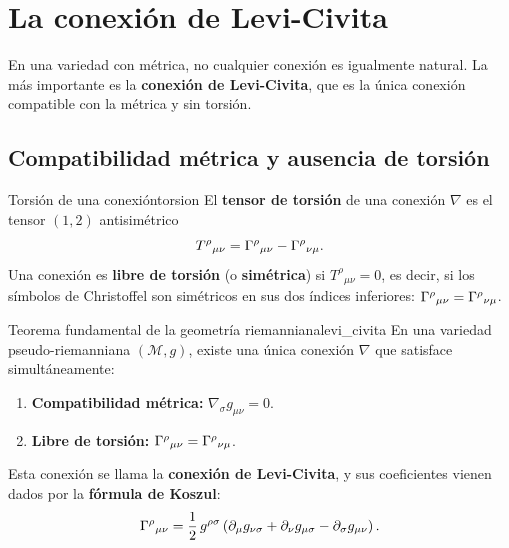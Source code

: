 \section{La conexión de Levi-Civita}
\label{sec:levi_civita}

En una variedad con métrica, no cualquier conexión es igualmente natural. La más importante es la \textbf{conexión de Levi-Civita}, que es la única conexión compatible con la métrica y sin torsión.

\subsection{Compatibilidad métrica y ausencia de torsión}

\begin{definicion}{Torsión de una conexión}{torsion}
El \textbf{tensor de torsión} de una conexión $\nabla$ es el tensor $(1,2)$ antisimétrico
\[
  T^\rho{}_{\mu\nu} = \Gamma^{\rho}{}_{\mu \nu} - \Gamma^{\rho}{}_{\nu \mu}.
\]
Una conexión es \textbf{libre de torsión} (o \textbf{simétrica}) si $T^\rho{}_{\mu\nu} = 0$, es decir, si los símbolos de Christoffel son simétricos en sus dos índices inferiores: $\Gamma^{\rho}{}_{\mu \nu} = \Gamma^{\rho}{}_{\nu \mu}$.
\end{definicion}

\begin{teorema}{Teorema fundamental de la geometría riemanniana}{levi_civita}
En una variedad pseudo-riemanniana $(\mathcal{M}, g)$, existe una única conexión $\nabla$ que satisface simultáneamente:
\begin{enumerate}[leftmargin=2em]
  \item \textbf{Compatibilidad métrica:} $\nabla_\sigma g_{\mu\nu} = 0$.
  \item \textbf{Libre de torsión:} $\Gamma^{\rho}{}_{\mu \nu} = \Gamma^{\rho}{}_{\nu \mu}$.
\end{enumerate}
Esta conexión se llama la \textbf{conexión de Levi-Civita}, y sus coeficientes vienen dados por la \textbf{fórmula de Koszul}:
\begin{equation}
  \Gamma^{\rho}{}_{\mu \nu} = \frac{1}{2}\, g^{\rho\sigma}
  \left(\partial_\mu g_{\nu\sigma} + \partial_\nu g_{\mu\sigma} - \partial_\sigma g_{\mu\nu}\right).
  \label{eq:christoffel}
\end{equation}
\end{teorema}


